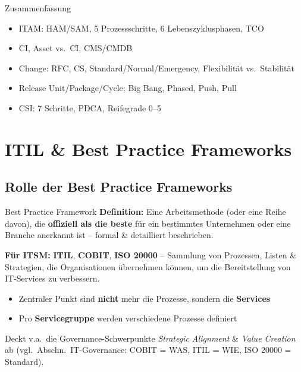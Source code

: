 \documentclass[a4paper, fontsize=7pt]{scrartcl}
\begin{document}
\begin{subbox}{Zusammenfassung}
\begin{itemize}
    \item ITAM: HAM/SAM, 5 Prozessschritte, 6 Lebenszyklusphasen, TCO
    \item CI, Asset vs.\ CI, CMS/CMDB
    \item Change: RFC, CS, Standard/Normal/Emergency, Flexibilität
          vs.\ Stabilität
    \item Release Unit/Package/Cycle; Big Bang, Phased, Push, Pull
    \item CSI: 7 Schritte, PDCA, Reifegrade 0--5
\end{itemize}
\end{subbox}

\section{ITIL \& Best Practice Frameworks}

\subsection{Rolle der Best Practice Frameworks}

\begin{mainbox}{Best Practice Framework}
\textbf{Definition:} Eine Arbeitsmethode (oder eine Reihe davon), die
\textbf{offiziell als die beste} für ein bestimmtes Unternehmen oder eine
Branche anerkannt ist -- formal \& detailliert beschrieben.

\textbf{Für ITSM:} \textbf{ITIL}, \textbf{COBIT}, \textbf{ISO 20000} --
Sammlung von Prozessen, Listen \& Strategien, die Organisationen übernehmen
können, um die Bereitstellung von IT-Services zu verbessern.
\begin{itemize}
    \item Zentraler Punkt sind \textbf{nicht} mehr die Prozesse, sondern
          die \textbf{Services}
    \item Pro \textbf{Servicegruppe} werden verschiedene Prozesse definiert
\end{itemize}
Deckt v.a.\ die Governance-Schwerpunkte \emph{Strategic Alignment} \&
\emph{Value Creation} ab (vgl.\ Abschn.\ IT-Governance: COBIT = WAS,
ITIL = WIE, ISO 20000 = Standard).
\end{mainbox}
\end{document}
